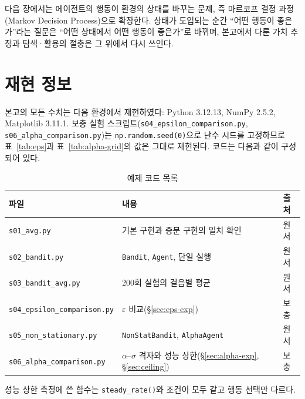 \documentclass[11pt,a4paper]{article}
\newcommand{\eps}{\varepsilon}
\begin{document}
다음 장에서는 에이전트의 행동이 환경의 상태를 바꾸는 문제, 즉 마르코프 결정 과정(Markov Decision
Process)으로 확장한다. 상태가 도입되는 순간 ``어떤 행동이 좋은가''라는 질문은 ``어떤 상태에서 어떤
행동이 좋은가''로 바뀌며, 본고에서 다룬 가치 추정과 탐색·활용의 절충은 그 위에서 다시 쓰인다.

\appendix
\section{재현 정보}

본고의 모든 수치는 다음 환경에서 재현하였다: Python 3.12.13, NumPy 2.5.2, Matplotlib 3.11.1.
보충 실험 스크립트(\texttt{s04\_\allowbreak epsilon\_\allowbreak comparison.py}, \texttt{s06\_\allowbreak alpha\_\allowbreak comparison.py})는
\lstinline|np.random.seed(0)|으로 난수 시드를 고정하므로 표~\ref{tab:eps}과 표~\ref{tab:alpha-grid}의
값은 그대로 재현된다. 코드는 다음과 같이 구성되어 있다.

\begin{table}[htbp]
\centering
\caption{예제 코드 목록}
\label{tab:code}
\small
\begin{tabular}{@{}lll@{}}
\toprule
파일 & 내용 & 출처 \\
\midrule
\texttt{s01\_avg.py}                & 기본 구현과 증분 구현의 일치 확인       & 원서 \\
\texttt{s02\_bandit.py}             & \texttt{Bandit}, \texttt{Agent}, 단일 실행 & 원서 \\
\texttt{s03\_bandit\_\allowbreak avg.py}        & 200회 실험의 걸음별 평균                & 원서 \\
\texttt{s04\_\allowbreak epsilon\_\allowbreak comparison.py}& $\eps$ 비교(\S\ref{sec:eps-exp})        & 보충 \\
\texttt{s05\_\allowbreak non\_\allowbreak stationary.py}    & \texttt{NonStatBandit}, \texttt{AlphaAgent} & 원서 \\
\texttt{s06\_\allowbreak alpha\_\allowbreak comparison.py}  & $\alpha$--$\sigma$ 격자와 성능 상한(\S\ref{sec:alpha-exp}, \S\ref{sec:ceiling}) & 보충 \\
\bottomrule
\end{tabular}
\end{table}

성능 상한 측정에 쓴 함수는 \texttt{steady\_rate()}와 조건이 모두 같고 행동 선택만 다르다.
\end{document}
